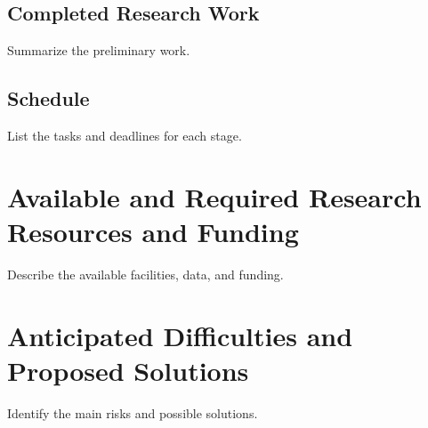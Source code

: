 \subsection{Completed Research Work}
Summarize the preliminary work.
\subsection{Schedule}
List the tasks and deadlines for each stage.
\section{Available and Required Research Resources and Funding}
Describe the available facilities, data, and funding.
\section{Anticipated Difficulties and Proposed Solutions}
Identify the main risks and possible solutions.
\backmatter
\nocite{*}

